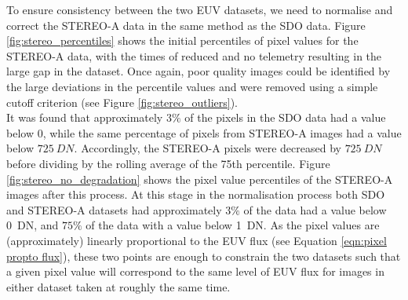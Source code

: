 \documentclass[11pt,a4paper,onecolumn]{report}
\begin{document}
To ensure consistency between the two EUV datasets, we need to normalise and
correct the STEREO-A data in the same method as the SDO data. Figure
\ref{fig:stereo_percentiles} shows the initial percentiles of pixel values for
the STEREO-A data, with the times of reduced and no telemetry resulting in the
large gap in the dataset. Once again, poor quality images could be identified by the
large deviations in the percentile values and were removed using a simple
cutoff criterion (see Figure \ref{fig:stereo_outliers}).\\

It was found that approximately $3 \%$ of the pixels in the SDO data had a value
below 0, while the same percentage of pixels from STEREO-A images had a value
below $\SI[]{725}[]{DN}$. Accordingly, the STEREO-A pixels were decreased by
$\SI[]{725}[]{DN}$ before dividing by the rolling average of the 75th
percentile. Figure \ref{fig:stereo_no_degradation} shows the pixel value
percentiles of the STEREO-A images after this process. At this stage in the
normalisation process both SDO and STEREO-A datasets had approximately $3 \%$ of
the data had a value below \SI{0}{DN}, and $75 \%$ of the data with a value
below \SI{1}{DN}. As the pixel values are (approximately) linearly proportional
to the EUV flux (see Equation \ref{eqn:pixel propto flux}), these two points are
enough to constrain the two datasets such that a given pixel value will
correspond to the same level of EUV flux for images in either dataset taken
at roughly the same time. \\
\end{document}
